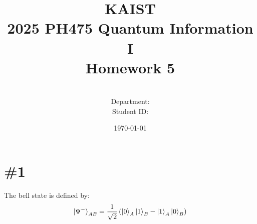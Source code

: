 \documentclass[a4paper,11pt]{article}
\title{KAIST\\2025 PH475 Quantum Information I\\
Homework 5\bigskip}
\author{\textbf{\Large \name} \\
Department: \department\\
Student ID: \studentid}
\date{\today}
\begin{document}
\thispagestyle{empty}
\maketitle
\tableofcontents
{}

\newcommand{\der}[2][]{\frac{d #1}{d #2}}
\newcommand{\pder}[2][]{\frac{\partial #1}{\partial #2}}
\newcommand{\grad}{\operatorname{grad}}
\newcommand{\diver}{\operatorname{div}}
\newcommand{\curl}{\operatorname{curl}}
\newcommand{\tr}{\operatorname{tr}}

\newcommand{\cnot}{C_{\text{NOT}}}
\newcommand{\cz}{C_{Z}}

\section{\#1}

The bell state is defined by:
\begin{equation}
    \ket{\Psi^-}_{AB}=\frac{1}{\sqrt 2}\left(\ket{0}_A\ket{1}_B-\ket{1}_A\ket{0}_B\right)
\end{equation}
\end{document}
